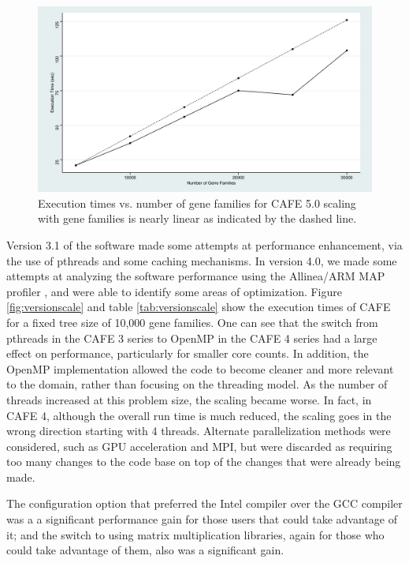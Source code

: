 \documentclass[acmtog, authorversion]{acmart}
\begin{document}
\begin{figure}[t] \label{fig:familyscale}
\includegraphics[scale = 0.075]{GeneFamilies}
\caption{Execution times vs. number of gene families for CAFE 5.0 scaling with gene families is nearly linear as indicated by the dashed line.}
\end{figure}

Version 3.1 of the software made some attempts at performance enhancement, via the use of pthreads and some caching mechanisms. In version 4.0, we made some attempts at analyzing the software performance using the Allinea/ARM MAP profiler , and were able to identify some areas of optimization. Figure \ref{fig:versionscale} and table \ref{tab:versionscale} show the execution times of CAFE for a fixed tree size of 10,000 gene families. One can see that the switch from pthreads in the CAFE 3 series to OpenMP in the CAFE 4 series had a large effect on performance, particularly for smaller core counts. In addition, the OpenMP implementation allowed the code to become cleaner and more relevant to the domain, rather than focusing on the threading model. As the number of threads increased at this problem size, the scaling became worse. In fact, in CAFE 4, although the overall run time is much reduced, the scaling goes in the wrong direction starting with 4 threads. Alternate parallelization methods were considered, such as GPU acceleration and MPI, but were discarded as requiring too many changes to the code base on top of the changes that were already being made.

The configuration option that preferred the Intel compiler over the GCC compiler was a a significant performance gain for those users that could take advantage of it; and the switch to using matrix multiplication libraries, again for those who could take advantage of them, also was a significant gain.
\end{document}
